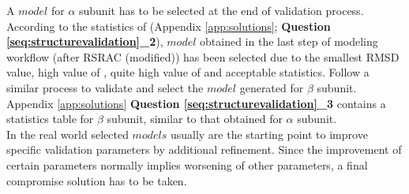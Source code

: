  A $model$ for  $\alpha$ subunit has to be selected at the end of validation process. According to the statistics of  (Appendix \ref{app:solutions}; \textbf{Question \ref{seq:structurevalidation}\_2}), $model$ obtained in the last step of modeling workflow ( after RSRAC (modified)) has been selected due to the smallest RMSD value, high value of \emringer {}, quite high value of \ccmask and acceptable \molprobity statistics. Follow a similar process to validate and select the $model$ generated for  $\beta$ subunit. Appendix \ref{app:solutions} \textbf{Question \ref{seq:structurevalidation}\_3} contains a statistics table for  $\beta$ subunit, similar to that obtained for  $\alpha$ subunit.\\
 
 In the real world selected $models$ usually are the starting point to improve specific validation parameters by additional refinement. Since the improvement of certain parameters normally implies worsening of other parameters, a final compromise solution has to be taken.\\

